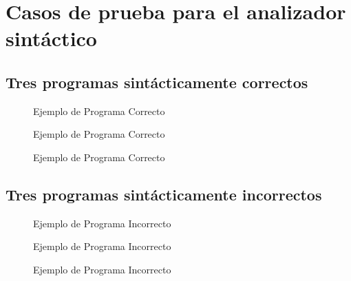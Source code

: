 \section{Casos de prueba para el analizador sintáctico}
\label{sec:syntaxTest}

\subsection{Tres programas sintácticamente correctos}
\label{subsec: syntaxCorr}
\begin{figure}[H]
    \caption{Ejemplo de Programa Correcto}
    \label{fig: corr1}
\end{figure}

\begin{figure}[H]
    \caption{Ejemplo de Programa Correcto}
    \label{fig: corr2}
\end{figure}

\begin{figure}[ht]
    \caption{Ejemplo de Programa Correcto}
    \label{fig: corr3}
\end{figure}

\subsection{Tres programas sintácticamente incorrectos}

\label{subsec: syntaxIncorr}
\begin{figure}[H]
    \caption{Ejemplo de Programa Incorrecto}
    \label{fig: incorr1}
\end{figure}

\begin{figure}[H]
    \caption{Ejemplo de Programa Incorrecto}
    \label{fig: incorr2}
\end{figure}

\begin{figure}[H]
    \caption{Ejemplo de Programa Incorrecto}
    \label{fig: incorr3}
\end{figure}